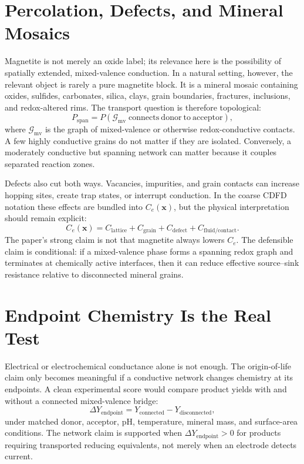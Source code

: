 \documentclass[11pt,a4paper]{article}
\begin{document}
\section{Percolation, Defects, and Mineral Mosaics}
Magnetite is not merely an oxide label; its relevance here is the possibility of spatially extended, mixed-valence conduction. In a natural setting, however, the relevant object is rarely a pure magnetite block. It is a mineral mosaic containing oxides, sulfides, carbonates, silica, clays, grain boundaries, fractures, inclusions, and redox-altered rims. The transport question is therefore topological:
\begin{equation}
P_{\mathrm{span}}
=
P\!\left(
\mathcal{G}_{\mathrm{mv}}
\;\mathrm{connects\ donor\ to\ acceptor}
\right),
\end{equation}
where $\mathcal{G}_{\mathrm{mv}}$ is the graph of mixed-valence or otherwise redox-conductive contacts. A few highly conductive grains do not matter if they are isolated. Conversely, a moderately conductive but spanning network can matter because it couples separated reaction zones.

Defects also cut both ways. Vacancies, impurities, and grain contacts can increase hopping sites, create trap states, or interrupt conduction. In the coarse CDFD notation these effects are bundled into $C_e(\bm{x})$, but the physical interpretation should remain explicit:
\begin{equation}
C_e(\bm{x})
=
C_{\mathrm{lattice}}
+C_{\mathrm{grain}}
+C_{\mathrm{defect}}
+C_{\mathrm{fluid/contact}}.
\end{equation}
The paper's strong claim is not that magnetite always lowers $C_e$. The defensible claim is conditional: if a mixed-valence phase forms a spanning redox graph and terminates at chemically active interfaces, then it can reduce effective source--sink resistance relative to disconnected mineral grains.

\section{Endpoint Chemistry Is the Real Test}
Electrical or electrochemical conductance alone is not enough. The origin-of-life claim only becomes meaningful if a conductive network changes chemistry at its endpoints. A clean experimental score would compare product yields with and without a connected mixed-valence bridge:
\begin{equation}
\Delta Y_{\mathrm{endpoint}}
=
Y_{\mathrm{connected}}
-
Y_{\mathrm{disconnected}},
\end{equation}
under matched donor, acceptor, pH, temperature, mineral mass, and surface-area conditions. The network claim is supported when $\Delta Y_{\mathrm{endpoint}}>0$ for products requiring transported reducing equivalents, not merely when an electrode detects current.
\end{document}
